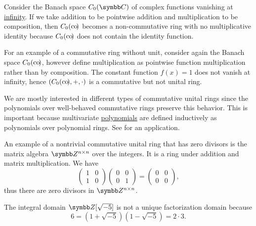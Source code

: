 \begin{example}
\begin{RefList}
     Consider the Banach space \( C_0(\BC) \) of complex functions vanishing at \hyperref[def:function_spaces/c0]{infinity}. If we take addition to be pointwise addition and multiplication to be composition, then \( C_0(\operatorname{co}\!) \) becomes a non-commutative ring with no multiplicative identity because \( C_0(\operatorname{co}\!) \) does not contain the identity function.

     For an example of a commutative ring without unit, consider again the Banach space \( C_0(\operatorname{co}\!) \), however define multiplication as pointwise function multiplication rather than by composition. The constant function \( f(x) = 1 \) does not vanish at infinity, hence \( (C_0(\operatorname{co}\!), +, \cdot) \) is a commutative but not unital ring.

     We are mostly interested in different types of commutative unital rings since the polynomials over well-behaved commutative rings preserve this behavior. This is important because multivariate \hyperref[def:multivariate_polynomial]{polynomials} are defined inductively as polynomials over polynomial rings. See  for an application.

    An example of a nontrivial commutative unital ring that has zero divisors is the matrix algebra \( \BZ^{n \times n} \) over the integers. It is a ring under addition and matrix multiplication. We have
    \begin{equation*}
      \begin{pmatrix}
        1 & 0 \\
        1 & 0
      \end{pmatrix}
      \begin{pmatrix}
        0 & 0 \\
        0 & 1
      \end{pmatrix}
      =
      \begin{pmatrix}
        0 & 0 \\
        0 & 0
      \end{pmatrix},
    \end{equation*}
    thus there are zero divisors in \( \BZ^{n \times n} \).

    \cite[388]{Knapp2016BAlg} The integral domain \( \BZ[\sqrt{-5}] \) is not a unique factorization domain because
    \begin{equation*}
      6 = (1 + \sqrt{-5}) (1 - \sqrt{-5}) = 2 \cdot 3.
    \end{equation*}


\end{RefList}
\end{example}
